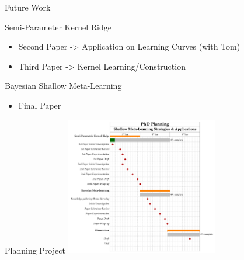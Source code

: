 \documentclass[aspectratio=169]{beamer}
\begin{document}
\begin{frame}{Future Work}
  \begin{minipage}{0.5\textwidth}
    \color{Pink} Semi-Parameter Kernel Ridge 
    \begin{itemize}
      \item Second Paper -> Application on Learning Curves (with Tom)
      \item Third Paper -> Kernel Learning/Construction
    \end{itemize}
  \end{minipage}%
  \begin{minipage}{0.5\textwidth}
  {
    \color{Pink} Bayesian Shallow Meta-Learning
    \begin{itemize}
      \item Final Paper
    \end{itemize}
  }
  \end{minipage}
\end{frame}

\begin{frame}{Planning Project}
  \centering
  \includegraphics[width=0.5\textwidth]{figures/plan.pdf} %
\end{frame}
\end{document}
